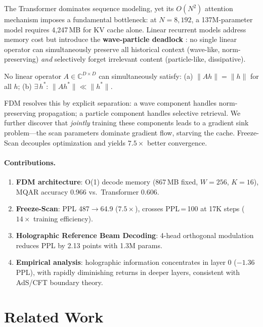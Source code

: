 \documentclass{article}
\begin{document}
The Transformer \citep{vaswani2017attention} dominates sequence modeling,
yet its $O(N^2)$ attention mechanism imposes a fundamental bottleneck:
at $N{=}8{,}192$, a 137M-parameter model requires 4{,}247\,MB for KV cache alone.
Linear recurrent models \citep{gu2023mamba,peng2023rwkv} address memory cost
but introduce the \textbf{wave-particle deadlock}
\citep{fan2026mipt}: no single linear operator can simultaneously
preserve all historical context (wave-like, norm-preserving)
\emph{and} selectively forget irrelevant content (particle-like, dissipative).

\begin{proposition}
No linear operator $A \in \mathbb{C}^{D \times D}$ can simultaneously
satisfy: (a) $\|Ah\| = \|h\|$ for all $h$; (b) $\exists\, h^*$:
$\|Ah^*\| \ll \|h^*\|$.
\end{proposition}

FDM resolves this by explicit separation: a wave component handles
norm-preserving propagation; a particle component handles selective retrieval.
We further discover that \emph{jointly} training these components leads to
a gradient sink problem---the scan parameters dominate gradient flow,
starving the cache. Freeze-Scan decouples optimization and yields
$7.5\times$ better convergence.

\paragraph{Contributions.}
\begin{enumerate}
\item \textbf{FDM architecture}: O(1) decode memory (867\,MB fixed,
  $W{=}256$, $K{=}16$), MQAR accuracy 0.966 vs.\ Transformer 0.606.
\item \textbf{Freeze-Scan}: PPL 487$\to$64.9 ($7.5\times$), crosses
  PPL\,=\,100 at 17K steps ($14\times$ training efficiency).
\item \textbf{Holographic Reference Beam Decoding}: 4-head orthogonal
  modulation reduces PPL by 2.13 points with 1.3M params.
\item \textbf{Empirical analysis}: holographic information concentrates
  in layer 0 ($-1.36$ PPL), with rapidly diminishing returns in deeper
  layers, consistent with AdS/CFT boundary theory.
\end{enumerate}

\section{Related Work}
\end{document}
